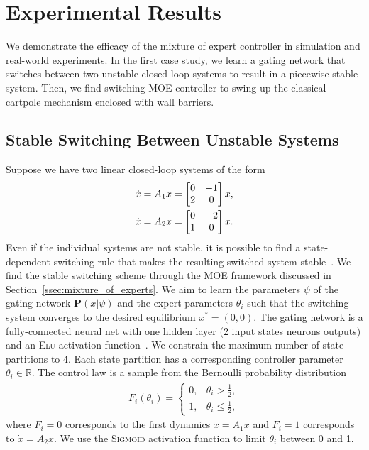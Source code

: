 \section{Experimental Results}
\label{sec:moe_results}
We demonstrate the efficacy of the mixture of expert controller in simulation
and real-world experiments.
%
In the first case study, we learn a gating network that switches between two
unstable closed-loop systems to result in a piecewise-stable system.
%
Then, we find switching MOE controller to swing up the classical cartpole
mechanism enclosed with wall barriers.
%

\subsection{Stable Switching Between Unstable Systems}

Suppose we have two linear closed-loop systems of the form 
\begin{equation}
    \begin{gathered}
        \dot{x} = A_1x = \begin{bmatrix}0 & -1 \\ 2 & 0\end{bmatrix}x, \\
        \dot{x} = A_2x = \begin{bmatrix}0 & -2 \\ 1 & 0\end{bmatrix}x.
    \end{gathered}
    \label{eq:unstable_closedloop}
\end{equation}
%
Even if the individual systems are not stable, it is possible to find a
state-dependent switching rule that makes the resulting switched system
stable~\cite{liberzon2003switching}. 
%
We find the stable switching scheme through the MOE framework discussed in
Section~\ref{ssec:mixture_of_experts}.
%
We aim to learn the parameters $\psi$ of the gating network $\mathbf{P}(x|
\psi)$ and the expert parameters $\theta_i$ such that the switching system
converges to the desired equilibrium $x^* = (0, 0)$.
%
The gating network is a fully-connected neural net with one hidden layer (2 input states 
 neurons  outputs) and an \textsc{Elu} activation
function~\cite{clevert2015fast}.
%
We constrain the maximum number of state partitions to $4$.
%
Each state partition has a corresponding controller parameter $\theta_i \in
\mathbb{R}$. 
%
The control law is a sample from the Bernoulli probability distribution
\begin{align}
    F_i(\theta_i) = \begin{cases}
       0, & \theta_i > \frac{1}{2}, \\
       1, & \theta_i \leq \frac{1}{2},
    \end{cases}
    \label{eq:bernoulli}
\end{align}
\noindent where $F_i = 0$ corresponds to the first dynamics $\dot{x} = A_1
x$ and $F_i=1$ corresponds to $\dot{x} = A_2x$.
%
We use the \textsc{Sigmoid} activation function to limit $\theta_i$ between 0
and 1.

